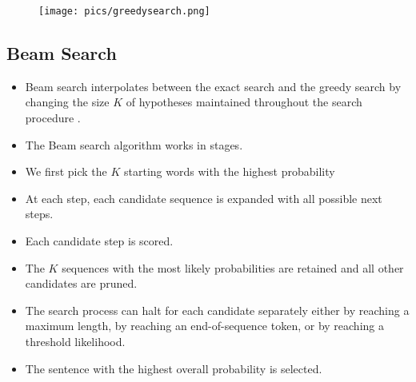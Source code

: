         
        
         \begin{figure}[h]
        	\texttt{[image: pics/greedysearch.png]}
        \end{figure}        
        
        
        
        



\subsection{Beam Search}
\begin{itemize}
\item Beam search interpolates between the exact search and the greedy search by changing the size $K$ of hypotheses maintained throughout the search procedure \cite{cho2015natural}.
\item The Beam search algorithm works in stages.
\item  We first pick the $K$ starting words with the highest probability 
\item At each step, each candidate sequence is expanded with all possible next steps. 
\item Each candidate step is scored. 
\item The $K$ sequences with the most likely probabilities are retained and all other candidates are pruned. 
\item The search process can halt for each candidate separately either by reaching a maximum length, by reaching an end-of-sequence token, or by reaching a threshold likelihood.
\item The sentence with the highest overall probability is selected.
\end{itemize}
        






